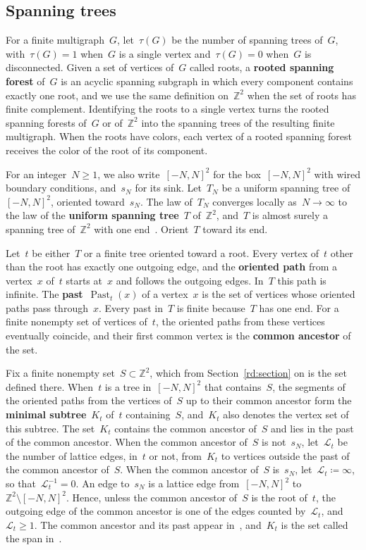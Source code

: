 \documentclass[11pt]{amsart}
\numberwithin{equation}{section}
\newcommand{\Z}{\mathbb Z}
\newcommand{\cL}{\mathscr{L}}
\begin{document}
\subsection{Spanning trees}\label{ssec:prelim-trees}

For a finite multigraph~$G$, let~$\tau(G)$ be the number of spanning trees of~$G$, with~$\tau(G)=1$ when~$G$ is a single vertex and~$\tau(G)=0$ when~$G$ is disconnected. Given a set of vertices of~$G$ called roots, a \textbf{rooted spanning forest} of~$G$ is an acyclic spanning subgraph in which every component contains exactly one root, and we use the same definition on~$\Z^2$ when the set of roots has finite complement. Identifying the roots to a single vertex turns the rooted spanning forests of~$G$ or of~$\Z^2$ into the spanning trees of the resulting finite multigraph. When the roots have colors, each vertex of a rooted spanning forest receives the color of the root of its component.

For an integer~$N\geq1$, we also write~$[-N,N]^2$ for the box~$[-N,N]^2$ with wired boundary conditions, and~$s_N$ for its sink. Let~$T_N$ be a uniform spanning tree of~$[-N,N]^2$, oriented toward~$s_N$. The law of~$T_N$ converges locally as~$N\to\infty$ to the law of the \textbf{uniform spanning tree}~$T$ of~$\Z^2$, and~$T$ is almost surely a spanning tree of~$\Z^2$ with one end~\citep[Theorems~6.1 and~6.3(i)]{Jarai2018}. Orient~$T$ toward its end.

Let~$t$ be either~$T$ or a finite tree oriented toward a root. Every vertex of~$t$ other than the root has exactly one outgoing edge, and the \textbf{oriented path} from a vertex~$x$ of~$t$ starts at~$x$ and follows the outgoing edges. In~$T$ this path is infinite. The \textbf{past}~$\operatorname{Past}_t(x)$ of a vertex~$x$ is the set of vertices whose oriented paths pass through~$x$. Every past in~$T$ is finite because~$T$ has one end. For a finite nonempty set of vertices of~$t$, the oriented paths from these vertices eventually coincide, and their first common vertex is the \textbf{common ancestor} of the set.

Fix a finite nonempty set~$S\subset\Z^2$, which from Section~\ref{rd:section} on is the set defined there. When~$t$ is a tree in~$[-N,N]^2$ that contains~$S$, the segments of the oriented paths from the vertices of~$S$ up to their common ancestor form the \textbf{minimal subtree}~$K_t$ of~$t$ containing~$S$, and~$K_t$ also denotes the vertex set of this subtree. The set~$K_t$ contains the common ancestor of~$S$ and lies in the past of the common ancestor. When the common ancestor of~$S$ is not~$s_N$, let~$\cL_t$ be the number of lattice edges, in~$t$ or not, from~$K_t$ to vertices outside the past of the common ancestor of~$S$. When the common ancestor of~$S$ is~$s_N$, let~$\cL_t\coloneqq\infty$, so that~$\cL_t^{-1}=0$. An edge to~$s_N$ is a lattice edge from~$[-N,N]^2$ to~$\Z^2\setminus[-N,N]^2$. Hence, unless the common ancestor of~$S$ is the root of~$t$, the outgoing edge of the common ancestor is one of the edges counted by~$\cL_t$, and~$\cL_t\geq1$. The common ancestor and its past appear in~\citet[Section~3.1]{AthreyaJarai2004}, and~$K_t$ is the set called the span in~\citet[page~2 of the electronic supplement]{AthreyaJarai2006}.
\end{document}
